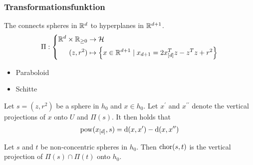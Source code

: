 \begin{frame}
    \frametitle{Transformationsfunktion}

    \begin{definition}
        The  connects spheres in $\mathbb{R}^d$ to hyperplanes in $\mathbb{R}^{d+1}$.
        \begin{align}
            \Pi: \left\{\begin{aligned}
                    \mathbb{R}^{d} \times \mathbb{R}_{\geq 0} &\to \mathcal{H}\\
                    (z, r^2) &\mapsto \left\{ x \in \mathbb{R}^{d+1} \mid x_{d+1} = 2x_{[d]}^Tz - z^Tz + r^2 \right\}
                \end{aligned}\right.
        \end{align}
    \end{definition}

    \begin{itemize}
        \item Paraboloid
        \item Schitte
    \end{itemize}

    \begin{lemma}
        Let $s = (z, r^2)$ be a sphere in $h_0$ and $x \in h_0$.
        Let $x^\prime$ and $x^{\prime\prime}$ denote the vertical projections of $x$ onto $U$ and $\Pi(s)$. It then holds that
        \begin{align}
            \operatorname{pow}(x_{[d]}, s) = \operatorname{d}(x, x^\prime) - \operatorname{d}(x, x^{\prime\prime})
        \end{align}
    \end{lemma}

    \begin{lemma}
        \label{lem:verticalprojection}
        Let $s$ and $t$ be non-concentric spheres in $h_0$.
        Then $\operatorname{chor}(s, t)$ is the vertical projection of $\Pi(s) \cap \Pi(t)$ onto $h_0$.
    \end{lemma}
\end{frame}

